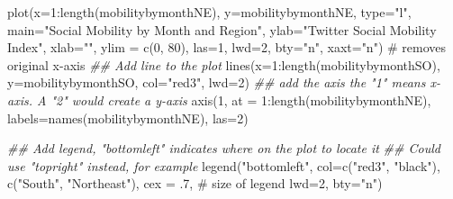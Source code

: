 \documentclass[
  letterpaper,
  DIV=11,
  numbers=noendperiod]{scrreprt}
\newenvironment{Shaded}{\begin{snugshade}}{\end{snugshade}}
\newcommand{\AttributeTok}[1]{\textcolor[rgb]{0.40,0.45,0.13}{#1}}
\newcommand{\CommentTok}[1]{\textcolor[rgb]{0.37,0.37,0.37}{#1}}
\newcommand{\DecValTok}[1]{\textcolor[rgb]{0.68,0.00,0.00}{#1}}
\newcommand{\DocumentationTok}[1]{\textcolor[rgb]{0.37,0.37,0.37}{\textit{#1}}}
\newcommand{\FunctionTok}[1]{\textcolor[rgb]{0.28,0.35,0.67}{#1}}
\newcommand{\NormalTok}[1]{\textcolor[rgb]{0.00,0.23,0.31}{#1}}
\newcommand{\SpecialCharTok}[1]{\textcolor[rgb]{0.37,0.37,0.37}{#1}}
\newcommand{\StringTok}[1]{\textcolor[rgb]{0.13,0.47,0.30}{#1}}
\begin{document}
\begin{Shaded}
\begin{Highlighting}[]
\FunctionTok{plot}\NormalTok{(}\AttributeTok{x=}\DecValTok{1}\SpecialCharTok{:}\FunctionTok{length}\NormalTok{(mobilitybymonthNE),}
     \AttributeTok{y=}\NormalTok{mobilitybymonthNE,}
     \AttributeTok{type=}\StringTok{"l"}\NormalTok{, }
     \AttributeTok{main=}\StringTok{"Social Mobility by Month and Region"}\NormalTok{,}
     \AttributeTok{ylab=}\StringTok{"Twitter Social Mobility Index"}\NormalTok{,}
     \AttributeTok{xlab=}\StringTok{""}\NormalTok{,}
     \AttributeTok{ylim =} \FunctionTok{c}\NormalTok{(}\DecValTok{0}\NormalTok{, }\DecValTok{80}\NormalTok{),}
     \AttributeTok{las=}\DecValTok{1}\NormalTok{, }
     \AttributeTok{lwd=}\DecValTok{2}\NormalTok{, }
     \AttributeTok{bty=}\StringTok{"n"}\NormalTok{,}
     \AttributeTok{xaxt=}\StringTok{"n"}\NormalTok{) }\CommentTok{\# removes original x{-}axis}
\DocumentationTok{\#\# Add line to the plot }
\FunctionTok{lines}\NormalTok{(}\AttributeTok{x=}\DecValTok{1}\SpecialCharTok{:}\FunctionTok{length}\NormalTok{(mobilitybymonthSO),}
     \AttributeTok{y=}\NormalTok{mobilitybymonthSO, }\AttributeTok{col=}\StringTok{"red3"}\NormalTok{, }\AttributeTok{lwd=}\DecValTok{2}\NormalTok{)}
\DocumentationTok{\#\# add the axis the "1" means x{-}axis. A "2" would create a y{-}axis}
\FunctionTok{axis}\NormalTok{(}\DecValTok{1}\NormalTok{, }\AttributeTok{at =} \DecValTok{1}\SpecialCharTok{:}\FunctionTok{length}\NormalTok{(mobilitybymonthNE), }
     \AttributeTok{labels=}\FunctionTok{names}\NormalTok{(mobilitybymonthNE), }\AttributeTok{las=}\DecValTok{2}\NormalTok{)}

\DocumentationTok{\#\# Add legend, "bottomleft" indicates where on the plot to locate it}
\DocumentationTok{\#\# Could use "topright" instead, for example}
\FunctionTok{legend}\NormalTok{(}\StringTok{"bottomleft"}\NormalTok{,  }\AttributeTok{col=}\FunctionTok{c}\NormalTok{(}\StringTok{"red3"}\NormalTok{, }\StringTok{"black"}\NormalTok{), }
       \FunctionTok{c}\NormalTok{(}\StringTok{"South"}\NormalTok{, }\StringTok{"Northeast"}\NormalTok{), }
       \AttributeTok{cex =}\NormalTok{ .}\DecValTok{7}\NormalTok{, }\CommentTok{\# size of legend}
       \AttributeTok{lwd=}\DecValTok{2}\NormalTok{,}
       \AttributeTok{bty=}\StringTok{"n"}\NormalTok{)}
\end{Highlighting}
\end{Shaded}
\end{document}
